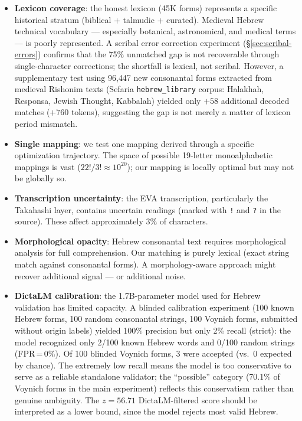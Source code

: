 \documentclass[11pt,a4paper]{article}
\begin{document}
\begin{itemize}
\item \textbf{Lexicon coverage}: the honest lexicon (45K forms) represents
a specific historical stratum (biblical + talmudic + curated). Medieval
Hebrew technical vocabulary --- especially botanical, astronomical, and
medical terms --- is poorly represented. A scribal error correction
experiment (\S\ref{sec:scribal-errors}) confirms that the 75\% unmatched
gap is not recoverable through single-character corrections; the shortfall
is lexical, not scribal. However, a supplementary test using 96{,}447 new
consonantal forms extracted from medieval Rishonim texts (Sefaria
\texttt{hebrew\_library} corpus: Halakhah, Responsa, Jewish Thought,
Kabbalah) yielded only $+58$ additional decoded matches ($+760$ tokens),
suggesting the gap is not merely a matter of lexicon period mismatch.

\item \textbf{Single mapping}: we test one mapping derived through a specific
optimization trajectory. The space of possible 19-letter monoalphabetic
mappings is vast ($22!/3! \approx 10^{20}$); our mapping is locally optimal
but may not be globally so.

\item \textbf{Transcription uncertainty}: the EVA transcription, particularly
the Takahashi layer, contains uncertain readings (marked with \texttt{!} and
\texttt{?} in the source). These affect approximately 3\% of characters.

\item \textbf{Morphological opacity}: Hebrew consonantal text requires
morphological analysis for full comprehension. Our matching is purely
lexical (exact string match against consonantal forms). A morphology-aware
approach might recover additional signal --- or additional noise.

\item \textbf{DictaLM calibration}: the 1.7B-parameter model used for
Hebrew validation has limited capacity. A blinded calibration experiment
(100 known Hebrew forms, 100 random consonantal strings, 100 Voynich
forms, submitted without origin labels) yielded 100\% precision but only
2\% recall (strict): the model recognized only 2/100 known Hebrew words
and 0/100 random strings (FPR\,=\,0\%). Of 100 blinded Voynich forms,
3 were accepted (vs.\ 0 expected by chance).
The extremely low recall means the model is too conservative to serve as
a reliable standalone validator; the ``possible'' category (70.1\% of
Voynich forms in the main experiment) reflects this conservatism rather
than genuine ambiguity. The $z=56.71$ DictaLM-filtered score should be
interpreted as a lower bound, since the model rejects most valid Hebrew.
\end{itemize}
\end{document}
